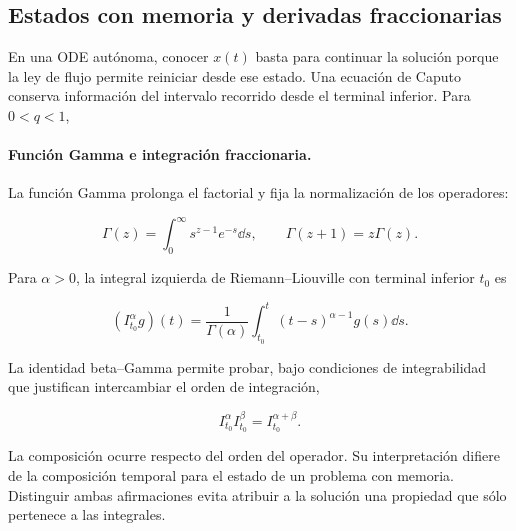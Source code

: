 
\subsection{Estados con memoria y derivadas fraccionarias}

En una ODE autónoma, conocer $x(t)$ basta para continuar la solución porque la ley de
flujo permite reiniciar desde ese estado. Una ecuación de Caputo conserva información
del intervalo recorrido desde el terminal inferior. Para $0<q<1$,

\paragraph{Función Gamma e integración fraccionaria.}
La función Gamma prolonga el factorial y fija la normalización de los operadores:

\begin{equation}
 \Gamma(z)=\int_0^\infty s^{z-1}e^{-s}\dd s,
 \qquad \Gamma(z+1)=z\Gamma(z).
 \label{eq:gt-gamma}
\end{equation}

Para $\alpha>0$, la integral izquierda de Riemann--Liouville con terminal inferior
$t_0$ es

\begin{equation}
 (I_{t_0}^{\alpha}g)(t)=\frac{1}{\Gamma(\alpha)}
 \int_{t_0}^{t}(t-s)^{\alpha-1}g(s)\dd s.
 \label{eq:gt-integral-rl}
\end{equation}

La identidad beta--Gamma permite probar, bajo condiciones de integrabilidad que
justifican intercambiar el orden de integración,

\begin{equation}
 I_{t_0}^{\alpha}I_{t_0}^{\beta}=I_{t_0}^{\alpha+\beta}.
 \label{eq:gt-semigrupo-orden}
\end{equation}

La composición ocurre respecto del orden del operador. Su interpretación difiere de la composición
temporal para el estado de un problema con memoria. Distinguir ambas afirmaciones
evita atribuir a la solución una propiedad que sólo pertenece a las integrales.

